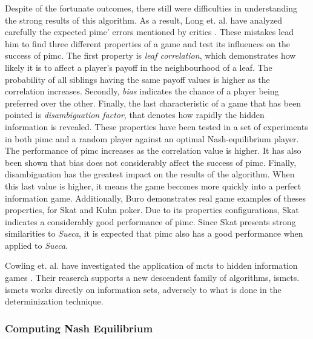 Despite of the fortunate outcomes, there still were difficulties in understanding the strong results of this algorithm.
As a result, Long et. al. have analyzed carefully the expected \gls{pimc}' errors mentioned by critics \cite{Long2010}.
These mistakes lead him to find three different properties of a game and test its influences on the success of \gls{pimc}.
The first property is \emph{leaf correlation}, which demonstrates how likely it is to affect a player's payoff in the neighbourhood of a leaf.
The probability of all siblings having the same payoff values is higher as the correlation increases.
Secondly, \emph{bias} indicates the chance of a player being preferred over the other.
Finally, the last characteristic of a game that has been pointed is \emph{disambiguation factor}, that denotes how rapidly the hidden information is revealed.
These properties have been tested in a set of experiments in both \gls{pimc} and a random player against an optimal Nash-equilibrium player.
The performance of \gls{pimc} increases as the correlation value is higher.
It has also been shown that bias does not considerably affect the success of \gls{pimc}.
Finally, disambiguation has the greatest impact on the results of the algorithm.
When this last value is higher, it means the game becomes more quickly into a perfect information game.
Additionally, Buro demonstrates real game examples of theses properties, for Skat and Kuhn poker.
Due to its properties configurations, Skat indicates a considerably good performance of \gls{pimc}.
Since Skat presents strong similarities to \emph{Sueca}, it is expected that \gls{pimc} also has a good performance when applied to \emph{Sueca}.


Cowling et. al. have investigated the application of \gls{mcts} to hidden information games \cite{Cowling2012}.
Their reaserch supports a new descendent family of algorithms, \gls{ismcts}.
\gls{ismcts} works directly on information sets, adversely to what is done in the determinization technique.



\subsubsection{Computing Nash Equilibrium}






